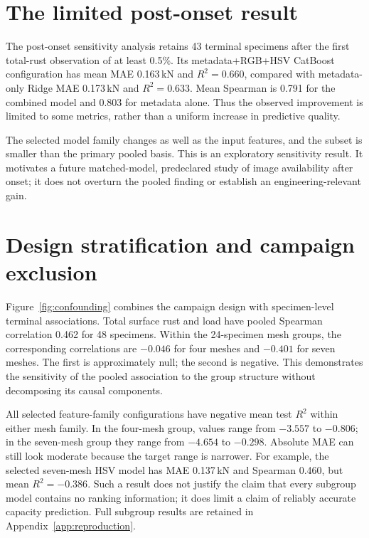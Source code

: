 \FloatBarrier

\section{The limited post-onset result}
The post-onset sensitivity analysis retains 43 terminal specimens after the first total-rust observation of at least 0.5\%. Its metadata+RGB+HSV CatBoost configuration has mean MAE 0.163\,kN and $R^2=0.660$, compared with metadata-only Ridge MAE 0.173\,kN and $R^2=0.633$. Mean Spearman is 0.791 for the combined model and 0.803 for metadata alone. Thus the observed improvement is limited to some metrics, rather than a uniform increase in predictive quality.

The selected model family changes as well as the input features, and the subset is smaller than the primary pooled basis. This is an exploratory sensitivity result. It motivates a future matched-model, predeclared study of image availability after onset; it does not overturn the pooled finding or establish an engineering-relevant gain.

\section{Design stratification and campaign exclusion}\label{sec:mesh}
Figure~\ref{fig:confounding} combines the campaign design with specimen-level terminal associations. Total surface rust and load have pooled Spearman correlation 0.462 for 48 specimens. Within the 24-specimen mesh groups, the corresponding correlations are $-0.046$ for four meshes and $-0.401$ for seven meshes. The first is approximately null; the second is negative. This demonstrates the sensitivity of the pooled association to the group structure without decomposing its causal components.


All selected feature-family configurations have negative mean test $R^2$ within either mesh family. In the four-mesh group, values range from $-3.557$ to $-0.806$; in the seven-mesh group they range from $-4.654$ to $-0.298$. Absolute MAE can still look moderate because the target range is narrower. For example, the selected seven-mesh HSV model has MAE 0.137\,kN and Spearman 0.460, but mean $R^2=-0.386$. Such a result does not justify the claim that every subgroup model contains no ranking information; it does limit a claim of reliably accurate capacity prediction. Full subgroup results are retained in Appendix~\ref{app:reproduction}.

